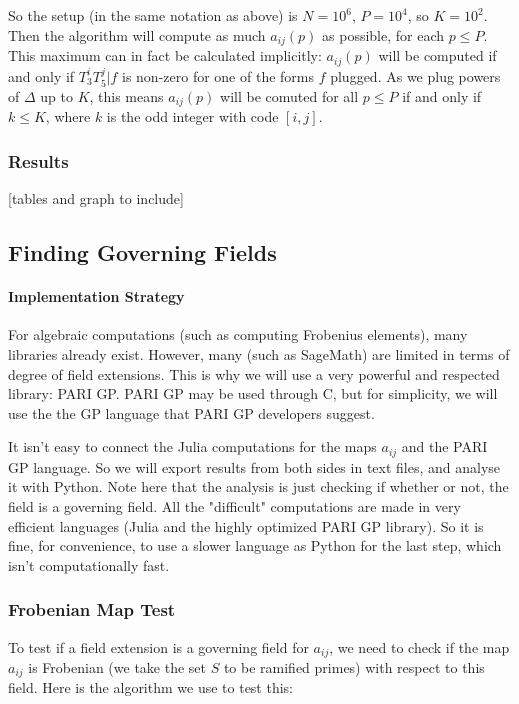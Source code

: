 So the setup (in the same notation as above) is $N=10^6$, $P=10^4$, so $K=10^2$.
Then the algorithm will compute as much $a_{ij}(p)$ as possible, for each $p \leq P$.
This maximum can in fact be calculated implicitly:
$a_{ij}(p)$ will be computed if and only if $T_3^iT_5^j|f$ is non-zero for one of the forms $f$ plugged.
As we plug powers of $\Delta$ up to $K$, this means $a_{ij}(p)$ will be comuted for all $p \leq P$ if and only if $k \leq K$, where $k$ is the odd integer with code $[i,j]$.

\subsubsection{Results}
[tables and graph to include]



\subsection{Finding Governing Fields}
\paragraph{Implementation Strategy}
For algebraic computations (such as computing Frobenius elements), many libraries already exist.
However, many (such as SageMath) are limited in terms of degree of field extensions.
This is why we will use a very powerful and respected library: PARI GP.
PARI GP may be used through C, but for simplicity, we will use the the GP language that PARI GP developers suggest.

It isn't easy to connect the Julia computations for the maps $a_{ij}$ and the PARI GP language.
So we will export results from both sides in text files, and analyse it with Python.
Note here that the analysis is just checking if whether or not, the field is a governing field.
All the "difficult" computations are made in very efficient languages (Julia and the highly optimized PARI GP library).
So it is fine, for convenience, to use a slower language as Python for the last step, which isn't computationally fast.


\subsubsection{Frobenian Map Test}
To test if a field extension is a governing field for $a_{ij}$, we need to check if the map $a_{ij}$ is Frobenian (we take the set $S$ to be ramified primes) with respect to this field.
Here is the algorithm we use to test this:

